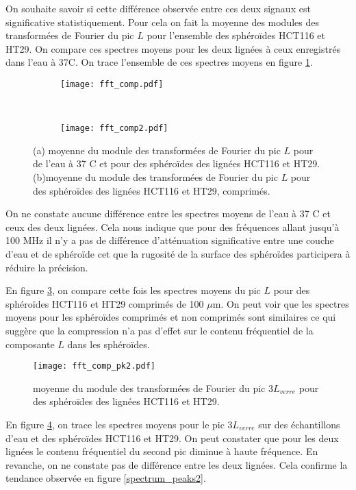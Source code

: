  On souhaite savoir si cette différence observée entre ces deux signaux est significative statistiquement. Pour cela on fait la moyenne des modules des transformées de Fourier du pic $L$ pour l'ensemble des sphéroïdes HCT116 et HT29. On compare ces spectres moyens pour les deux lignées à ceux enregistrés dans l'eau à 37\textdegree C. On trace l'ensemble de ces spectres moyens en figure \ref{fft_comp}.
\begin{figure}[ht!]
	\begin{subfigure}{0.5\textwidth}
	\centering
	\texttt{[image: fft\_comp.pdf]}
	\caption{ \label{fft_comp}}
	\end{subfigure}
	~~
	\begin{subfigure}{0.5\textwidth}
	\texttt{[image: fft\_comp2.pdf]}
		\caption{ \label{fft_comp2}}
	\end{subfigure}
	\caption{(a) moyenne du module des transformées de Fourier du pic $L$ pour de l'eau à 37 \textdegree C et pour des sphéroïdes des lignées HCT116 et HT29. (b)moyenne du module des transformées de Fourier du pic $L$  pour des sphéroïdes des lignées HCT116 et HT29, comprimés.}
\end{figure}
On ne constate aucune différence  entre les spectres  moyens de l'eau à 37 \textdegree C et ceux des deux lignées. Cela nous indique que  pour des fréquences allant jusqu'à 100 MHz  il n'y a pas de différence d'atténuation significative entre une 
couche d'eau et de sphéroïde cet que la rugosité de la surface des sphéroïdes participera à réduire la précision.

En figure \ref{fft_comp2}, on compare  cette fois les spectres moyens du pic  $L$  pour des sphéroïdes HCT116 et HT29  comprimés de 100 $\mu$m. On peut voir que les spectres moyens pour les sphéroïdes comprimés et non comprimés sont similaires ce qui  suggère que la compression  n'a pas d'effet sur le contenu fréquentiel de la composante $L$ dans les sphéroïdes.

\begin{figure}[ht!]
\centering
	\texttt{[image: fft\_comp\_pk2.pdf]}
	\caption{moyenne du module des transformées de Fourier du pic $3L_{verre}$  pour des sphéroïdes des lignées HCT116 et HT29.\label{fft_comp_pk2}}
\end{figure}
En figure  \ref{fft_comp_pk2}, on trace les spectres moyens pour le pic $3L_{verre}$ sur des échantillons d'eau et des sphéroïdes HCT116 et HT29. On peut constater que pour les deux lignées le contenu fréquentiel du second pic diminue  à haute fréquence. En revanche, on ne constate pas de différence entre les deux lignées. Cela confirme la tendance observée en figure \ref{spectrum_peaks2}. 

